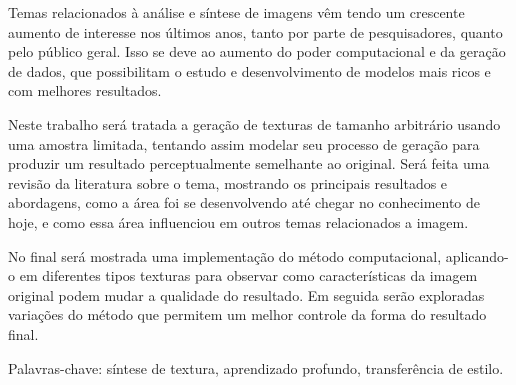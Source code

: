 \setlength{\absparsep}{18pt} 
\begin{resumo}[Resumo]
 
Temas relacionados à análise e síntese de imagens vêm
tendo um crescente aumento de interesse nos últimos anos,
tanto por parte de pesquisadores, quanto pelo público geral.
Isso se deve ao aumento do poder computacional e da
geração de dados, que possibilitam o estudo e desenvolvimento
de modelos mais ricos e com melhores resultados.

Neste trabalho será tratada a geração de texturas de
tamanho arbitrário usando uma amostra limitada,
tentando assim modelar seu processo de geração para
produzir um resultado perceptualmente semelhante
ao original. Será feita uma revisão da literatura
sobre o tema, mostrando os principais resultados e
abordagens, como a área foi se desenvolvendo até
chegar no conhecimento de hoje, e como essa área
influenciou em outros temas relacionados a imagem.

No final será mostrada uma implementação do método
computacional, aplicando-o
em diferentes tipos texturas para observar como
características da imagem original podem mudar a
qualidade do resultado. Em seguida serão exploradas
variações do método que permitem um melhor controle
da forma do resultado final.


 Palavras-chave: síntese de textura, aprendizado profundo, transferência de estilo.
\end{resumo}

